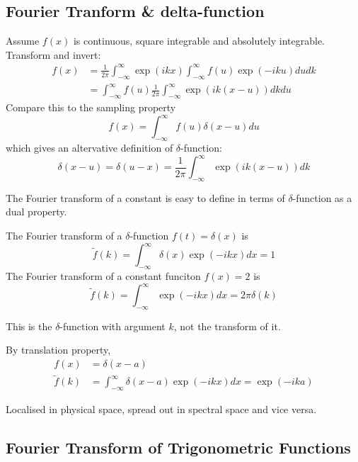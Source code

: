 \documentclass[a4paper]{article}
\newcommand*{\ft}{\tilde}
\begin{document}
\subsection{Fourier Tranform \& delta-function}

Assume \(f(x)\) is continuous, square integrable and absolutely integrable. Transform and invert:
\begin{align*}
  f(x) &= \frac{1}{2\pi} \int_{-\infty}^{\infty} \exp(ikx) \int_{-\infty}^{\infty} f(u) \exp(-iku) du dk \\
       &= \int_{-\infty}^{\infty} f(u) \frac{1}{2\pi} \int_{-\infty}^{\infty} \exp(ik(x - u)) dk du
\end{align*}
Compare this to the sampling property
\[
  f(x) = \int_{-\infty}^{\infty} f(u) \delta(x - u) du
\]
which gives an altervative definition of \(\delta\)-function:
\[
  \delta(x - u) = \delta(u - x) = \frac{1}{2\pi} \int_{-\infty}^{\infty} \exp(ik(x - u)) dk
\]

The Fourier transform of a constant is easy to define in terms of \(\delta\)-function as a dual property.

The Fourier transform of a \(\delta\)-function \(f(t) = \delta(x)\) is
\[
  \ft f(k) = \int_{-\infty}^{\infty} \delta(x) \exp(-ikx) dx = 1
\]
The Fourier transform of a constant funciton \(f(x) = 2\) is
\[
  \ft f(k) = \int_{-\infty}^{\infty} \exp(-ikx) dx = 2\pi \delta(k)
\]

\begin{note}
  This is the \(\delta\)-function with argument \(k\), not the transform of it.
\end{note}

By translation property,
\begin{align*}
  f(x) &= \delta(x - a) \\
  \ft f(k) &= \int_{-\infty}^{\infty} \delta(x - a) \exp(-ikx) dx = \exp(-ika)
\end{align*}

\begin{note}
  Localised in physical space, spread out in spectral space and vice versa.
\end{note}

\subsection{Fourier Transform of Trigonometric Functions}
\end{document}
